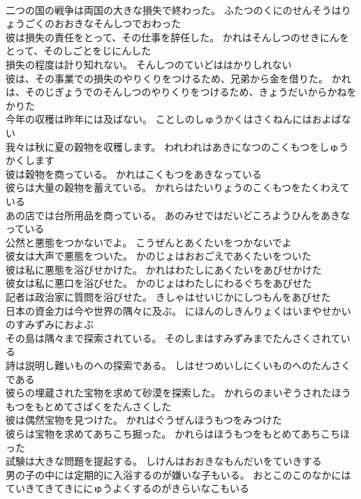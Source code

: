 \documentclass[8pt]{extreport}
\begin{document}
\begin{CJK}{UTF8}{min}
\\	二つの国の戦争は両国の大きな損失で終わった。	ふたつのくにのせんそうはりょうごくのおおきなそんしつでおわった 
\\	彼は損失の責任をとって、その仕事を辞任した。	かれはそんしつのせきにんをとって、そのしごとをじにんした 
\\	損失の程度は計り知れない。	そんしつのていどははかりしれない 
\\	彼は、その事業での損失のやりくりをつけるため、兄弟から金を借りた。	かれは、そのじぎょうでのそんしつのやりくりをつけるため、きょうだいからかねをかりた 
\\	今年の収穫は昨年には及ばない。	ことしのしゅうかくはさくねんにはおよばない 
\\	我々は秋に夏の穀物を収穫します。	われわれはあきになつのこくもつをしゅうかくします 
\\	彼は穀物を商っている。	かれはこくもつをあきなっている 
\\	彼らは大量の穀物を蓄えている。	かれらはたいりょうのこくもつをたくわえている 
\\	あの店では台所用品を商っている。	あのみせではだいどころようひんをあきなっている 
\\	公然と悪態をつかないでよ。	こうぜんとあくたいをつかないでよ 
\\	彼女は大声で悪態をついた。	かのじょはおおごえであくたいをついた 
\\	彼は私に悪態を浴びせかけた。	かれはわたしにあくたいをあびせかけた 
\\	彼女は私に悪口を浴びせた。	かのじょはわたしにわるぐちをあびせた 
\\	記者は政治家に質問を浴びせた。	きしゃはせいじかにしつもんをあびせた 
\\	日本の資金力は今や世界の隅々に及ぶ。	にほんのしきんりょくはいまやせかいのすみずみにおよぶ 
\\	その島は隅々まで探索されている。	そのしまはすみずみまでたんさくされている 
\\	詩は説明し難いものへの探索である。	しはせつめいしにくいものへのたんさくである 
\\	彼らの埋蔵された宝物を求めて砂漠を探索した。	かれらのまいぞうされたほうもつをもとめてさばくをたんさくした 
\\	彼は偶然宝物を見つけた。	かれはぐうぜんほうもつをみつけた 
\\	彼らは宝物を求めてあちこち掘った。	かれらはほうもつをもとめてあちこちほった 
\\	試験は大きな問題を提起する。	しけんはおおきなもんだいをていきする 
\\	男の子の中には定期的に入浴するのが嫌いな子もいる。	おとこのこのなかにはていきてきてきににゅうよくするのがきらいなこもいる 

\end{CJK}
\end{document}
